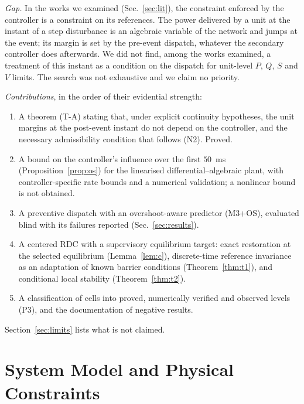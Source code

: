 \documentclass[11pt,twocolumn]{article}
\begin{document}
\emph{Gap.} In the works we examined (Sec.~\ref{sec:lit}), the constraint enforced by the controller is a constraint on its references. The power delivered by a unit at the instant of a step disturbance is an algebraic variable of the network and jumps at the event; its margin is set by the pre-event dispatch, whatever the secondary controller does afterwards. We did not find, among the works examined, a treatment of this instant as a condition on the dispatch for unit-level $P$, $Q$, $S$ and $V$ limits. The search was not exhaustive and we claim no priority.

\emph{Contributions}, in the order of their evidential strength:
\begin{enumerate}
\item A theorem (T-A) stating that, under explicit continuity hypotheses, the unit margins at the post-event instant do not depend on the controller, and the necessary admissibility condition that follows (N2). Proved.
\item A bound on the controller's influence over the first $50$~ms (Proposition~\ref{prop:os}) for the linearised differential--algebraic plant, with controller-specific rate bounds and a numerical validation; a nonlinear bound is not obtained.
\item A preventive dispatch with an overshoot-aware predictor (M3+OS), evaluated blind with its failures reported (Sec.~\ref{sec:results}).
\item A centered RDC with a supervisory equilibrium target: exact restoration at the selected equilibrium (Lemma~\ref{lem:c}), discrete-time reference invariance as an adaptation of known barrier conditions (Theorem~\ref{thm:t1}), and conditional local stability (Theorem~\ref{thm:t2}).
\item A classification of cells into proved, numerically verified and observed levels (P3), and the documentation of negative results.
\end{enumerate}
Section~\ref{sec:limits} lists what is not claimed.

\section{System Model and Physical Constraints}
\label{sec:model}
\end{document}
